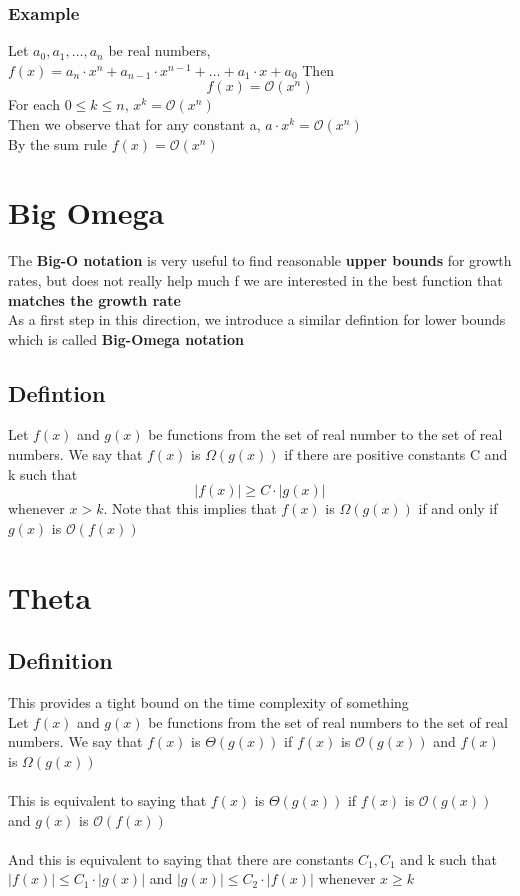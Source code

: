\documentclass{article}[18pt]
\begin{document}
\subsubsection{Example}
Let $a_0,a_1,\ldots,a_n$ be real numbers,\\
$f ( x ) = a _ { n } \cdot x ^ { n } + a _ { n - 1 } \cdot x ^ { n - 1 } + \ldots + a _ { 1 } \cdot x + a _ { 0 }$ Then
$$f(x)=\mathcal{O}(x^n)$$
For each $0\leqslant k\leqslant n$, $x^k=\mathcal{O}(x^n)$\\
Then we observe that for any constant a, $a\cdot x^k=\mathcal{O}(x^n)$\\
By the sum rule $f(x)=\mathcal{O}(x^n)$
\section{Big Omega}
The \textbf{Big-O notation} is very useful to find reasonable \textbf{upper bounds} for growth rates, but does not really help much f we are interested in the best function that \textbf{matches the growth rate}\\
As a first step in this direction, we introduce a similar defintion for lower bounds which is called \textbf{Big-Omega notation}
\subsection{Defintion}
Let $f(x)$ and $g(x)$ be functions from the set of real number to the set of real numbers. We say that $f(x)$ is $\Omega(g(x))$ if there are positive constants C and k such that
$$|f(x)|\geqslant C\cdot |g(x)|$$
whenever $x>k$. Note that this implies that $f(x)$ is $\Omega(g(x))$ if and only if $g(x)$ is $\mathcal{O}(f(x))$
\section{Theta}
\subsection{Definition}
This provides a tight bound on the time complexity of something\\



Let $f(x)$ and $g(x)$ be functions from the set of real numbers to the set of real numbers. We say that $f(x)$ is $\Theta(g(x))$ if $f(x)$ is $\mathcal{O}(g(x))$ and $f(x)$ is $\Omega(g(x))$\\
\\
This is equivalent to saying that $f(x)$ is $\Theta(g(x))$ if $f(x)$ is $\mathcal{O}(g(x))$ and $g(x)$ is $\mathcal{O}(f(x))$\\
\\
And this is equivalent to saying that there are constants $C_1,C_1$ and k such that $|f(x)|\leqslant C_1\cdot |g(x)|$ and $|g(x)|\leqslant C_2\cdot |f(x)|$ whenever $x\geqslant k$
\end{document}
